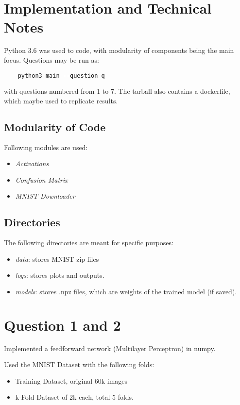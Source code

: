 \section {Implementation and Technical Notes}

Python 3.6 was used to code, with modularity of components being the main focus. Questions may be run as:

\begin{lstlisting}
    python3 main --question q
\end{lstlisting}

with questions numbered from 1 to 7. The tarball also contains a dockerfile, which maybe used to replicate results.

\subsection{Modularity of Code}

Following modules are used:
\begin{itemize}
\item  \textit{Activations}
\item \textit{Confusion Matrix}
\item \textit{MNIST Downloader}
\end{itemize}

\subsection{Directories}
The following directories are meant for specific purposes:
\begin{itemize}
\item  \textit{data}: stores MNIST zip files
\item \textit{logs}: stores plots and outputs.
\item \textit{models}: stores .npz files, which are weights of the trained model (if saved).
\end{itemize}

\section {Question 1 and 2}

Implemented a feedforward network (Multilayer Perceptron) in numpy.

Used the MNIST Dataset with the following folds:
\begin{itemize}
\item Training Dataset, original 60k images
\item k-Fold Dataset of 2k each, total 5 folds.
\end{itemize}

